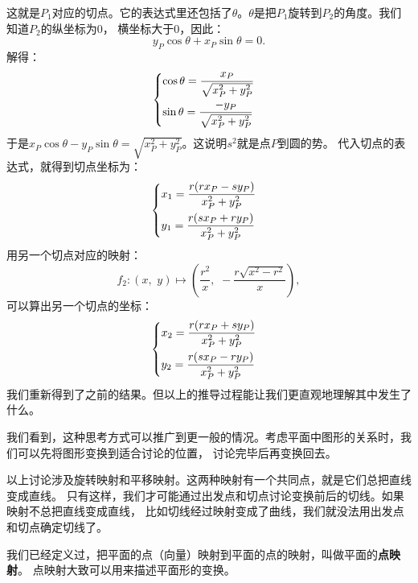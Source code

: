 \documentclass[12pt,UTF8]{ctexbook}
\begin{document}
这就是$P_1$对应的切点。它的表达式里还包括了$\theta$。$\theta$是把$P_1$旋转到$P_2$的角度。我们知道$P_2$的纵坐标为$0$，
横坐标大于$0$，因此：
$$ y_P \cos{\theta} + x_P\sin{\theta} = 0. $$
解得：
\begin{alignat*}{1}
&   \begin{dcases}
        \cos{\theta} = \frac{x_P}{\sqrt{x_P^2 + y_P^2}} \\
        \sin{\theta} = \frac{-y_P}{\sqrt{x_P^2 + y_P^2}} 
    \end{dcases}
\end{alignat*}
于是$x_P\cos{\theta} - y_P\sin{\theta} = \sqrt{x_P^2 + y_P^2}$。这说明$s^2$就是点$P$到圆的势。
代入切点的表达式，就得到切点坐标为：
\begin{alignat*}{1}
    &   \begin{dcases}
    x_1 = \frac{r(rx_P - sy_P) }{x_P^2+y_P^2} \\
    y_1 = \frac{r(sx_P + ry_P)}{x_P^2+y_P^2}
\end{dcases}
\end{alignat*}
用另一个切点对应的映射：
$$f_2: (x,\,\, y) \mapsto \left(\frac{r^2}{x},\,\, -\frac{r\sqrt{x^2 - r^2}}{x}\right),$$
可以算出另一个切点的坐标：
\begin{alignat*}{1}
    &   \begin{dcases}
        x_2 = \frac{r(rx_P + sy_P) }{x_P^2+y_P^2} \\
        y_2 = \frac{r(sx_P - ry_P)}{x_P^2+y_P^2}
    \end{dcases}
\end{alignat*}
我们重新得到了之前的结果。但以上的推导过程能让我们更直观地理解其中发生了什么。

我们看到，这种思考方式可以推广到更一般的情况。考虑平面中图形的关系时，我们可以先将图形变换到适合讨论的位置，
讨论完毕后再变换回去。

以上讨论涉及旋转映射和平移映射。这两种映射有一个共同点，就是它们总把直线变成直线。
只有这样，我们才可能通过出发点和切点讨论变换前后的切线。如果映射不总把直线变成直线，
比如切线经过映射变成了曲线，我们就没法用出发点和切点确定切线了。

我们已经定义过，把平面的点（向量）映射到平面的点的映射，叫做平面的\textbf{点映射}。
点映射大致可以用来描述平面形的变换。
\end{document}
